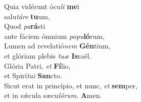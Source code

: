 \evenverse Quia vidérunt ócu\textit{li} \textbf{me}i~\*\\
\evenverse salu\textit{tá}\textit{re} \textbf{tu}um,\\
\oddverse Quod \textit{pa}\textbf{rá}sti~\*\\
\oddverse ante fáciem ómnium \textit{po}\textit{pu}\textbf{ló}rum,\\
\evenverse Lumen ad revelatió\textit{nem} \textbf{Gén}tium,~\*\\
\evenverse et glóriam plebis \textit{tu}\textit{æ} \textbf{Is}raël.\\
\oddverse Glória Patri, \textit{et} \textbf{Fí}lio,~\*\\
\oddverse et Spirí\textit{tu}\textit{i} \textbf{San}cto.\\
\evenverse Sicut erat in princípio, et nunc, \textit{et} \textbf{sem}per,~\*\\
\evenverse et in sǽcula sæcu\textit{ló}\textit{rum}. \textbf{A}men.\\
